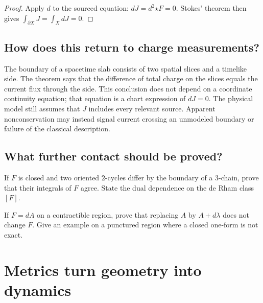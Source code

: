 \begin{proof}
Apply $d$ to the sourced equation: $dJ=d^2{\star F}=0$.  Stokes' theorem then
gives $\int_{\partial X}J=\int_XdJ=0$.
\end{proof}

\section{How does this return to charge measurements?}

The boundary of a spacetime slab consists of two spatial slices and a timelike
side.  The theorem says that the difference of total charge on the slices
equals the current flux through the side.  This conclusion does not depend on
a coordinate continuity equation; that equation is a chart expression of
$dJ=0$.  The physical model still assumes that $J$ includes every relevant
source.  Apparent nonconservation may instead signal current crossing an
unmodeled boundary or failure of the classical description.

\section{What further contact should be proved?}

\begin{exercise}
If $F$ is closed and two oriented $2$-cycles differ by the boundary of a
$3$-chain, prove that their integrals of $F$ agree.  State the dual dependence
on the de Rham class $[F]$.
\end{exercise}

\begin{exercise}
If $F=dA$ on a contractible region, prove that replacing $A$ by $A+d\lambda$
does not change $F$.  Give an example on a punctured region where a closed
one-form is not exact.
\end{exercise}


\chapter{Metrics turn geometry into dynamics}
\label{ch:metric}



